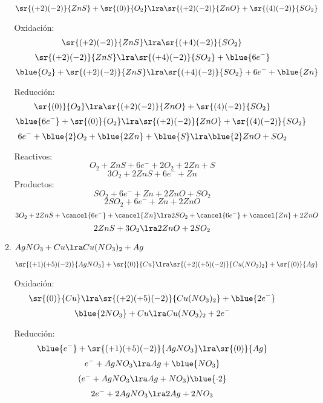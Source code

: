 \documentclass[../Práctica.root.tex]{subfiles}
\begin{document}
\begin{enumerate}
\begin{enumerate}
                    $\sr{(+2)(-2)}{ZnS} + \sr{(0)}{O_2} \lra \sr{(+2)(-2)}{ZnO} + \sr{(4)(-2)}{SO_2}$

                    \begin{multicols}{2}
                        Oxidación:
                        \[ \sr{(+2)(-2)}{ZnS} \lra \sr{(+4)(-2)}{SO_2} \]
                        \[ \sr{(+2)(-2)}{ZnS} \lra \sr{(+4)(-2)}{SO_2} + \blue{6e^-} \]
                        \[ \blue{O_2} + \sr{(+2)(-2)}{ZnS} \lra \sr{(+4)(-2)}{SO_2} + 6 e^- + \blue{Zn} \]

                        \columnbreak

                        Reducción:
                        \[ \sr{(0)}{O_2} \lra \sr{(+2)(-2)}{ZnO} + \sr{(4)(-2)}{SO_2} \]
                        \[ \blue{6e^-} + \sr{(0)}{O_2} \lra \sr{(+2)(-2)}{ZnO} + \sr{(4)(-2)}{SO_2} \]
                        \[ 6 e^- + \blue{2} O_2 + \blue{2Zn} + \blue{S} \lra \blue{2} ZnO + SO_2 \]
                    \end{multicols}


                    Reactivos:
                    \[ O_2 + ZnS + 6 e^- + 2 O_2 + 2Zn + S \]
                    \[ 3 O_2 + 2 ZnS + 6 e^- + Zn \]
                    Productos:
                    \[ SO_2 + 6 e^- + Zn + 2 ZnO + SO_2 \]
                    \[ 2 SO_2 + 6 e^- + Zn + 2 ZnO \]
                    \[ 3 O_2 + 2 ZnS + \cancel{6 e^-} + \cancel{Zn} \lra 2 SO_2 + \cancel{6 e^-} + \cancel{Zn} + 2 ZnO \]
                    \[ 2 ZnS + 3 O_2 \lra 2 ZnO + 2 SO_2 \]

              \item $AgNO_3 + Cu \lra Cu(NO_3)_2 + Ag$

                    $\sr{(+1)(+5)(-2)}{AgNO_3} + \sr{(0)}{Cu} \lra \sr{(+2)(+5)(-2)}{Cu(NO_3)_2} + \sr{(0)}{Ag}$

                    \begin{multicols}{2}
                        Oxidación:
                        \[ \sr{(0)}{Cu} \lra \sr{(+2)(+5)(-2)}{Cu(NO_3)_2} + \blue{2e^-} \]
                        \[ \blue{2NO_3} + Cu \lra Cu(NO_3)_2 + 2 e^- \]

                        \columnbreak

                        Reducción:
                        \[ \blue{e^-} + \sr{(+1)(+5)(-2)}{AgNO_3} \lra \sr{(0)}{Ag} \]
                        \[ e^- + AgNO_3 \lra Ag + \blue{NO_3} \]
                        \[ (e^- + AgNO_3 \lra Ag + NO_3)\blue{\cdot 2} \]
                        \[ 2 e^- + 2 AgNO_3 \lra 2 Ag + 2 NO_3 \]
                    \end{multicols}


\end{enumerate}
\end{enumerate}
\end{document}
